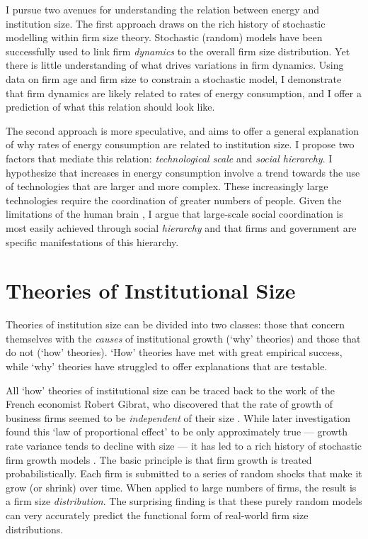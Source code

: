 I pursue  two avenues for understanding the relation between energy and institution size. The first approach draws on the rich history of stochastic  modelling within firm size theory. Stochastic (random) models have been successfully used to link firm \emph{dynamics} to the overall firm size distribution. Yet there is little understanding of what drives variations in firm dynamics. Using data on firm age and firm size to constrain a stochastic model, I demonstrate that firm dynamics are likely related to rates of energy consumption, and I offer a prediction of what this relation should look like.


The second approach is more speculative, and aims to offer a general explanation of why rates of energy consumption are related to institution size. I propose two factors that mediate this relation: \textit{technological scale} and \textit{social hierarchy}. I hypothesize that increases in energy consumption involve a trend towards the use of technologies that are larger and more complex. These increasingly large technologies require the coordination of greater numbers of people. Given the limitations of the human brain \cite{dunbar_neocortex_1992}, I argue that large-scale social coordination is most easily achieved through social \textit{hierarchy} \cite{turchin_evolution_2009} and that firms and government are specific manifestations of this hierarchy. 



\section{Theories of Institutional Size}
\label{Sec_literature}

Theories of institution size can be divided into two classes: those that concern themselves with the \emph{causes} of institutional growth (`why' theories) and those that do not (`how' theories). `How' theories have met with great empirical success, while `why' theories have struggled to offer explanations that are testable.

All `how' theories  of institutional size can be traced back to the work of the French economist Robert Gibrat, who discovered that the rate of growth of business firms seemed to be \emph{independent} of their size \cite{gibrat_les_1931}. While later investigation  found this `law of proportional effect' to be only approximately true --- growth rate variance tends to decline with size  \cite{hart_size_1962,hymer_firm_1962,singh_size_1975} ---  it has led to a rich history of stochastic firm growth models \cite{de_wit_firm_2005,sutton_gibrats_1997}. The basic principle is that firm growth is treated probabilistically. Each firm is submitted to a series of random shocks that make it grow (or shrink) over time. When applied to large numbers of firms, the result is a firm size \emph{distribution}. The surprising finding is that these purely random models can very accurately predict the functional form of real-world  firm size distributions. 


